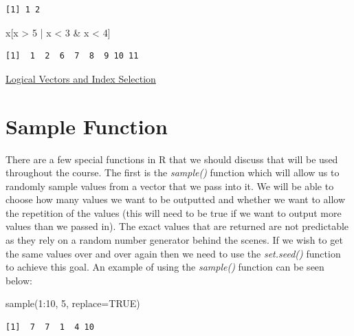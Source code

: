 \documentclass[
  letterpaper,
  DIV=11,
  numbers=noendperiod]{scrreprt}
\newenvironment{Shaded}{\begin{snugshade}}{\end{snugshade}}
\newcommand{\AttributeTok}[1]{\textcolor[rgb]{0.40,0.45,0.13}{#1}}
\newcommand{\ConstantTok}[1]{\textcolor[rgb]{0.56,0.35,0.01}{#1}}
\newcommand{\DecValTok}[1]{\textcolor[rgb]{0.68,0.00,0.00}{#1}}
\newcommand{\FunctionTok}[1]{\textcolor[rgb]{0.28,0.35,0.67}{#1}}
\newcommand{\NormalTok}[1]{\textcolor[rgb]{0.00,0.23,0.31}{#1}}
\newcommand{\SpecialCharTok}[1]{\textcolor[rgb]{0.37,0.37,0.37}{#1}}
\begin{document}
\begin{verbatim}
[1] 1 2
\end{verbatim}

\begin{Shaded}
\begin{Highlighting}[]
\NormalTok{x[x }\SpecialCharTok{\textgreater{}} \DecValTok{5} \SpecialCharTok{|}\NormalTok{ x }\SpecialCharTok{\textless{}} \DecValTok{3} \SpecialCharTok{\&}\NormalTok{ x }\SpecialCharTok{\textless{}} \DecValTok{4}\NormalTok{]}
\end{Highlighting}
\end{Shaded}

\begin{verbatim}
[1]  1  2  6  7  8  9 10 11
\end{verbatim}

\begin{watch}{}{}
    \href{https://youtu.be/QIrSEcEYRVk}{Logical Vectors and Index Selection}
\end{watch}

\section{Sample Function}\label{sample-function}

There are a few special functions in R that we should discuss that will
be used throughout the course. The first is the \emph{sample()} function
which will allow us to randomly sample values from a vector that we pass
into it. We will be able to choose how many values we want to be
outputted and whether we want to allow the repetition of the values
(this will need to be true if we want to output more values than we
passed in). The exact values that are returned are not predictable as
they rely on a random number generator behind the scenes. If we wish to
get the same values over and over again then we need to use the
\emph{set.seed()} function to achieve this goal. An example of using the
\emph{sample()} function can be seen below:

\begin{Shaded}
\begin{Highlighting}[]
\FunctionTok{sample}\NormalTok{(}\DecValTok{1}\SpecialCharTok{:}\DecValTok{10}\NormalTok{, }\DecValTok{5}\NormalTok{, }\AttributeTok{replace=}\ConstantTok{TRUE}\NormalTok{)}
\end{Highlighting}
\end{Shaded}

\begin{verbatim}
[1]  7  7  1  4 10
\end{verbatim}
\end{document}
